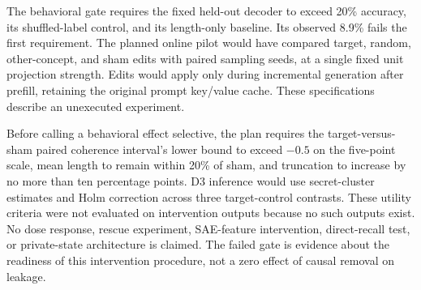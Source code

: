 The behavioral gate requires the fixed held-out decoder to exceed 20\% accuracy, its shuffled-label control, and its length-only baseline. Its observed 8.9\% fails the first requirement. The planned online pilot would have compared target, random, other-concept, and sham edits with paired sampling seeds, at a single fixed unit projection strength. Edits would apply only during incremental generation after prefill, retaining the original prompt key/value cache. These specifications describe an unexecuted experiment.

Before calling a behavioral effect selective, the plan requires the target-versus-sham paired coherence interval's lower bound to exceed $-0.5$ on the five-point scale, mean length to remain within 20\% of sham, and truncation to increase by no more than ten percentage points. D3 inference would use secret-cluster estimates and Holm correction across three target-control contrasts. These utility criteria were not evaluated on intervention outputs because no such outputs exist. No dose response, rescue experiment, SAE-feature intervention, direct-recall test, or private-state architecture is claimed. The failed gate is evidence about the readiness of this intervention procedure, not a zero effect of causal removal on leakage.
